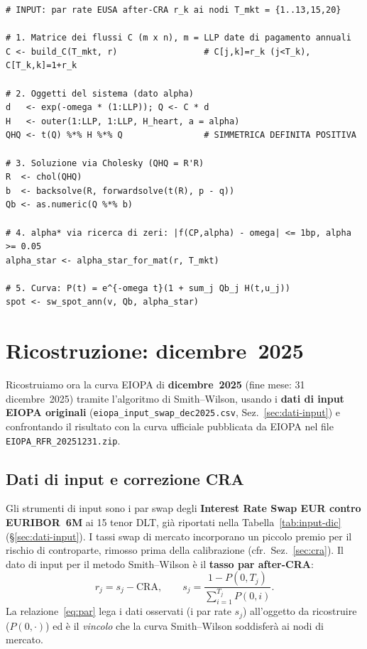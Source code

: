 \documentclass[11pt,a4paper]{article}
\theoremstyle{plain}
\theoremstyle{definition}
\theoremstyle{remark}
\newcommand{\CRA}{\ensuremath{\mathrm{CRA}}}
\begin{document}
\begin{algobox}
\begin{Verbatim}[fontsize=\small]
# INPUT: par rate EUSA after-CRA r_k ai nodi T_mkt = {1..13,15,20}

# 1. Matrice dei flussi C (m x n), m = LLP date di pagamento annuali
C <- build_C(T_mkt, r)                 # C[j,k]=r_k (j<T_k), C[T_k,k]=1+r_k

# 2. Oggetti del sistema (dato alpha)
d   <- exp(-omega * (1:LLP)); Q <- C * d
H   <- outer(1:LLP, 1:LLP, H_heart, a = alpha)
QHQ <- t(Q) %*% H %*% Q                # SIMMETRICA DEFINITA POSITIVA

# 3. Soluzione via Cholesky (QHQ = R'R)
R  <- chol(QHQ)
b  <- backsolve(R, forwardsolve(t(R), p - q))
Qb <- as.numeric(Q %*% b)

# 4. alpha* via ricerca di zeri: |f(CP,alpha) - omega| <= 1bp, alpha >= 0.05
alpha_star <- alpha_star_for_mat(r, T_mkt)

# 5. Curva: P(t) = e^{-omega t}(1 + sum_j Qb_j H(t,u_j))
spot <- sw_spot_ann(v, Qb, alpha_star)
\end{Verbatim}
\end{algobox}

\section{Ricostruzione: dicembre~2025}
\label{sec:ricostruzione}

Ricostruiamo ora la curva EIOPA di \textbf{dicembre~2025} (fine mese: 31 dicembre~2025)
tramite l'algoritmo di Smith--Wilson, usando i \textbf{dati di input EIOPA originali}
(\texttt{eiopa\_input\_swap\_dec2025.csv}, Sez.~\ref{sec:dati-input}) e confrontando il
risultato con la curva ufficiale pubblicata da EIOPA nel file \texttt{EIOPA\_RFR\_20251231.zip}.

\subsection{Dati di input e correzione CRA}

Gli strumenti di input sono i par swap degli \textbf{Interest Rate Swap EUR contro
EURIBOR~6M} ai 15 tenor DLT, gi\`a riportati nella Tabella~\ref{tab:input-dic}
(§\ref{sec:dati-input}). I tassi swap di mercato incorporano un piccolo premio per il rischio
di controparte, rimosso prima della calibrazione (cfr.\ Sez.~\ref{sec:cra}). Il dato di input
per il metodo Smith--Wilson \`e il \textbf{tasso par after-CRA}:
\begin{equation}
  r_j = s_j - \CRA,
  \qquad
  s_j = \frac{1 - P(0,T_j)}{\displaystyle\sum_{i=1}^{T_j} P(0,i)} .
  \label{eq:par}
\end{equation}
La relazione~\eqref{eq:par} lega i dati osservati (i par rate $s_j$) all'oggetto da
ricostruire ($P(0,\cdot)$) ed \`e il \emph{vincolo} che la curva Smith--Wilson soddisfer\`a
ai nodi di mercato.
\end{document}
